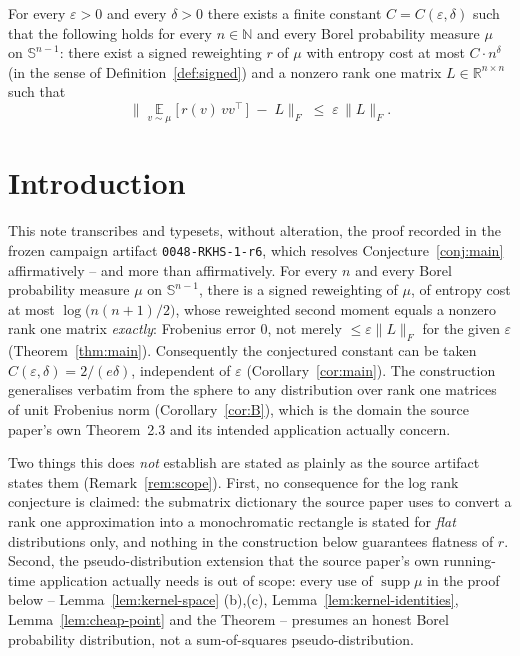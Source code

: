 \documentclass{aicr-solution}
\newcommand{\Expect}{\operatorname*{\mathbb{E}}}
\newcommand{\Sph}{\mathbb{S}^{n-1}}
\newcommand{\Reals}{\mathbb{R}}
\newcommand{\Nat}{\mathbb{N}}
\newcommand{\supp}{\operatorname{supp}}
\begin{document}
\begin{conjecture}\label{conj:main}
For every $\varepsilon > 0$ and every $\delta > 0$ there exists a
finite constant $C = C(\varepsilon, \delta)$ such that the following
holds for every $n \in \Nat$ and every Borel probability measure $\mu$
on $\Sph$: there exist a signed reweighting $r$ of $\mu$ with entropy
cost at most $C \cdot n^{\delta}$ (in the sense of
Definition~\ref{def:signed}) and a nonzero rank one matrix $L \in
\Reals^{n \times n}$ such that
\[
  \Big\| \Expect_{v \sim \mu}\big[\, r(v)\, v v^{\top} \,\big]
    \;-\; L \Big\|_{F} \;\le\; \varepsilon \, \|L\|_{F}.
\]
\end{conjecture}

\section{Introduction}\label{sec:intro}

This note transcribes and typesets, without alteration, the proof
recorded in the frozen campaign artifact \texttt{0048-RKHS-1-r6},
which resolves Conjecture~\ref{conj:main} affirmatively -- and more
than affirmatively. For every $n$ and every Borel probability measure
$\mu$ on $\Sph$, there is a signed reweighting of $\mu$, of entropy
cost at most $\log\big(n(n+1)/2\big)$, whose reweighted second moment
equals a nonzero rank one matrix \emph{exactly}: Frobenius error $0$,
not merely $\le \varepsilon\|L\|_{F}$ for the given $\varepsilon$
(Theorem~\ref{thm:main}). Consequently the conjectured constant can be
taken $C(\varepsilon,\delta) = 2/(e\delta)$, independent of
$\varepsilon$ (Corollary~\ref{cor:main}). The construction generalises
verbatim from the sphere to any distribution over rank one matrices of
unit Frobenius norm (Corollary~\ref{cor:B}), which is the domain the
source paper's own Theorem~2.3 and its intended application actually
concern.

Two things this does \emph{not} establish are stated as plainly as
the source artifact states them (Remark~\ref{rem:scope}). First, no
consequence for the log rank conjecture is claimed: the submatrix
dictionary the source paper uses to convert a rank one approximation
into a monochromatic rectangle is stated for \emph{flat} distributions
only, and nothing in the construction below guarantees flatness of
$r$. Second, the pseudo-distribution extension that the source paper's
own running-time application actually needs is out of scope: every
use of $\supp\mu$ in the proof below -- Lemma~\ref{lem:kernel-space}
(b),(c), Lemma~\ref{lem:kernel-identities}, Lemma~\ref{lem:cheap-point}
and the Theorem -- presumes an honest Borel probability distribution,
not a sum-of-squares pseudo-distribution.
\end{document}
